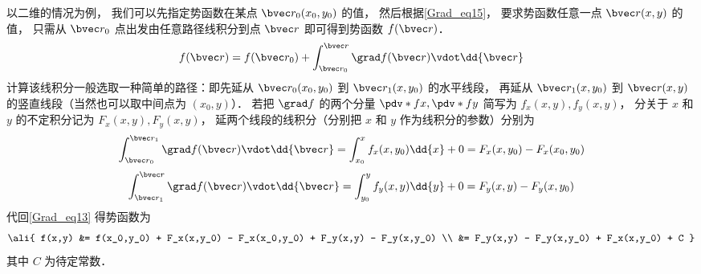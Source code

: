 以二维的情况为例， 我们可以先指定势函数在某点 $\bvec r_0 (x_0,y_0)$ 的值， 然后根据\autoref{Grad_eq15}， 要求势函数任意一点 $\bvec r (x,y)$ 的值， 只需从 $\bvec r_0$ 点出发由任意路径线积分到点 $\bvec r$ 即可得到势函数 $f(\bvec r)$．
\begin{equation}\label{Grad_eq13}
f(\bvec r) =  f(\bvec r_0) + \int_{\bvec r_0}^{\bvec r} \grad f(\bvec r) \vdot \dd{\bvec r} 
\end{equation}
计算该线积分一般选取一种简单的路径：即先延从 $\bvec r_0(x_0,y_0)$ 到 $\bvec r_1(x, y_0)$ 的水平线段， 再延从 $\bvec r_1(x, y_0)$ 到 $\bvec r(x,y)$ 的竖直线段（当然也可以取中间点为 $(x_0,y)$）． 若把 $\grad f$ 的两个分量 $\pdv*{f}{x}, \pdv*{f}{y}$ 简写为 $f_x(x,y), f_y(x,y)$， 分关于 $x$ 和 $y$ 的不定积分记为 $F_x(x,y), F_y(x,y)$， 延两个线段的线积分（分别把 $x$ 和 $y$ 作为线积分的参数）分别为
\begin{equation}
 \int_{\bvec r_0}^{\bvec r_1} \grad f(\bvec r) \vdot \dd{\bvec r} = \int_{x_0}^{x} f_x(x,y_0) \dd{x} + 0 = F_x(x,y_0) - F_x(x_0,y_0)
\end{equation}
\begin{equation}
 \int_{\bvec r_1}^{\bvec r} \grad f(\bvec r) \vdot \dd{\bvec r} = \int_{y_0}^{y} f_y(x,y) \dd{y} + 0 = F_y(x,y) - F_y(x,y_0)
\end{equation}
代回\autoref{Grad_eq13} 得势函数为
\begin{equation}\label{Grad_eq23}\ali{
f(x,y) &= f(x_0,y_0) + F_x(x,y_0) - F_x(x_0,y_0) + F_y(x,y) - F_y(x,y_0) \\
&= F_y(x,y) - F_y(x,y_0) + F_x(x,y_0) + C
}\end{equation}
其中 $C$ 为待定常数．


